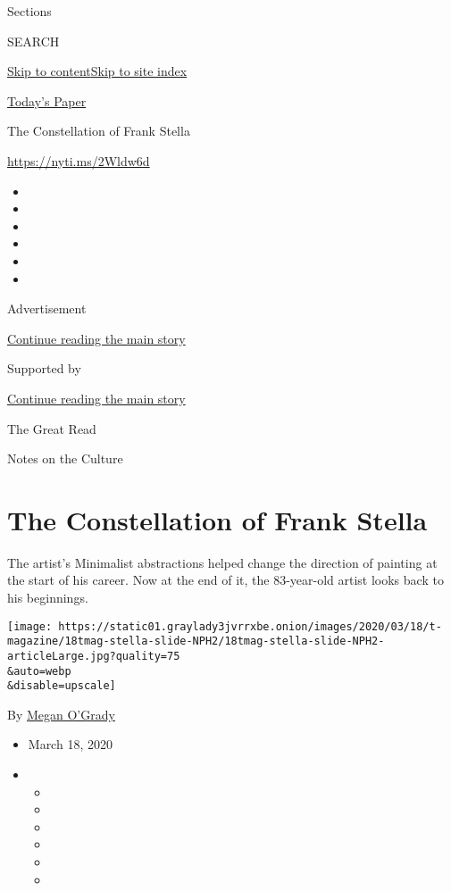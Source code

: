 Sections

SEARCH

\protect\hyperlink{site-content}{Skip to
content}\protect\hyperlink{site-index}{Skip to site index}

\href{https://myaccount.nytimes3xbfgragh.onion/auth/login?response_type=cookie\&client_id=vi}{}

\href{https://www.nytimes3xbfgragh.onion/section/todayspaper}{Today's
Paper}

The Constellation of Frank Stella

\url{https://nyti.ms/2Wldw6d}

\begin{itemize}
\item
\item
\item
\item
\item
\item
\end{itemize}

Advertisement

\protect\hyperlink{after-top}{Continue reading the main story}

Supported by

\protect\hyperlink{after-sponsor}{Continue reading the main story}

The Great Read

Notes on the Culture

\hypertarget{the-constellation-of-frank-stella}{%
\section{The Constellation of Frank
Stella}\label{the-constellation-of-frank-stella}}

The artist's Minimalist abstractions helped change the direction of
painting at the start of his career. Now at the end of it, the
83-year-old artist looks back to his beginnings.

\texttt{[image: https://static01.graylady3jvrrxbe.onion/images/2020/03/18/t-magazine/18tmag-stella-slide-NPH2/18tmag-stella-slide-NPH2-articleLarge.jpg?quality=75\\\&auto=webp\\\&disable=upscale]}

By \href{https://www.nytimes3xbfgragh.onion/by/megan-o-grady}{Megan
O'Grady}

\begin{itemize}
\item
  March 18, 2020
\item
  \begin{itemize}
  \item
  \item
  \item
  \item
  \item
  \item
  \end{itemize}
\end{itemize}

